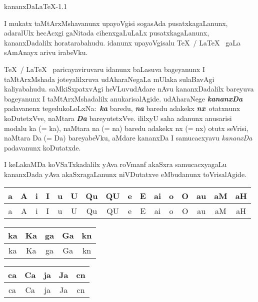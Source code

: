 \documentclass{article}
\begin{document}
\centerline{\Huge kananxDa{\huge\rm\LaTeX}-1.1 } 
\medskip

I mukatx taMtArxMshavanunx upayoVgisi sogasAda pusatxkagaLanunx, adaralUlx
hecAcxgi gaNitada cihenxgaLuLaLx pusatxka\-gaLanunx, kananxDadalilx
horatarabahudu. idanunx upayoVgisalu {\rm \TeX\ / \LaTeX\ } gaLa sAmAnayx arivu
irabeVku.

\medskip
{\rm\TeX\ / \LaTeX\ } paricayaviruvaru idanunx baLasuva bageyanunx I
taMtArxMshada joteyalilxruva udAharaNegaLa mUlaka sulaBavAgi kaliyabahudu. 
saMkiSxpatxvAgi
heVLuvudAdare nAvu kananxDadalilx bare\-yuva bageyanunx I taMtArxMshadalilx
anukarisalAgide. udAharaNege {\sl\bfseries kananxDa} padavanenx tegedukoLoLxNa:~{\sl\bfseries ka} 
baredu, {\sl\bfseries na} baredu adakekx \kern3pt\hbox{\sl\bfseries nx}~otatxnunx koDutetxVve,
naMtara {\sl\bfseries Da} bareyutetxVve.
ililxyU saha adanunx anusarisi modalu {\rm ka} (= ka), naMtara {\rm na} (= na)
baredu adakekx {\rm nx} (= \kern3pt\hbox{nx}) otutx seVrisi, naMtara {\rm Da} (= Da)
bareyabeVku, aMdare {\rm kananxDa} I samucacxyavu {\sl kananxDa} padavanunx
koDutatxde.

I keLakaMDa koVSaTxkadalilx yAva roVmanf akaSxra samucacxyagaLu kananxDada
yAva akaSxragaLanunx niVDutatxve eMbudanunx toVrisalAgide. 
\smallskip

{\tabcolsep=5.4pt
\begin{tabular}{|c|c|c|c|c|c|c|c|c|c|c|c|c|c|c|c|}
\hline
{\rm a} & {\rm A} & {\rm i} & {\rm I} & {\rm u} & {\rm U} & {\rm Qu} & {\rm
QU} & {\rm e} & {\rm E} & {\rm ai} & {\rm o} & {\rm O} & {\rm au} & {\rm aM}
& {\rm aH} \\ 
\hline
a & A & i & I & u & U & Qu & QU & e & E & ai & o & O & au & aM & aH \\
\hline
\end{tabular}}

\bigskip
\begin{tabular}{|c|c|c|c|c|}
\hline
{\rm ka} & {\rm Ka} & {\rm ga} &  {\rm Ga} & {\rm kn}\\ 
\hline
ka & Ka & ga & Ga & kn\\
\hline
\end{tabular}

\bigskip
\begin{tabular}{|c|c|c|c|c|}
\hline
{\rm ca} & {\rm Ca} & {\rm ja} &  {\rm Ja} & {\rm cn}\\ 
\hline
ca & Ca & ja & Ja & cn\\
\hline
\end{tabular}
\end{document}
